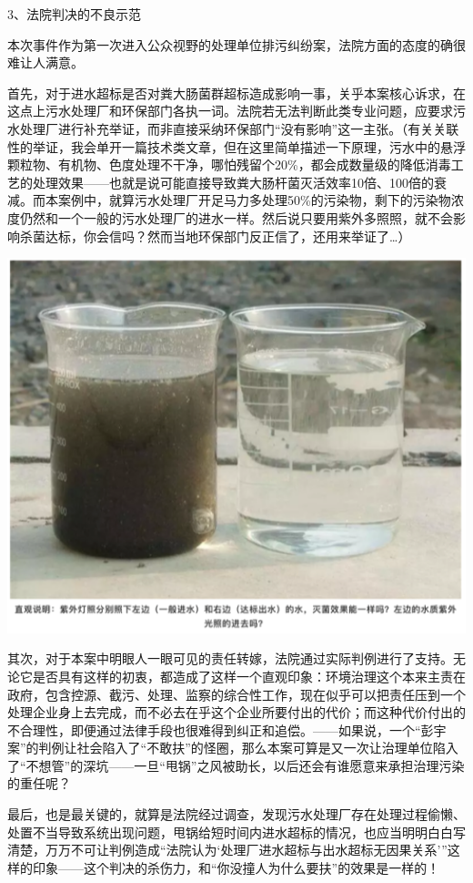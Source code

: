 \documentclass[]{book}
\begin{document}
3、法院判决的不良示范

本次事件作为第一次进入公众视野的处理单位排污纠纷案，法院方面的态度的确很难让人满意。

首先，对于进水超标是否对粪大肠菌群超标造成影响一事，关乎本案核心诉求，在这点上污水处理厂和环保部门各执一词。法院若无法判断此类专业问题，应要求污水处理厂进行补充举证，而非直接采纳环保部门``没有影响''这一主张。（有关关联性的举证，我会单开一篇技术类文章，但在这里简单描述一下原理，污水中的悬浮颗粒物、有机物、色度处理不干净，哪怕残留个20\%，都会成数量级的降低消毒工艺的处理效果------也就是说可能直接导致粪大肠杆菌灭活效率10倍、100倍的衰减。而本案例中，就算污水处理厂开足马力多处理50\%的污染物，剩下的污染物浓度仍然和一个一般的污水处理厂的进水一样。然后说只要用紫外多照照，就不会影响杀菌达标，你会信吗？然而当地环保部门反正信了，还用来举证了\ldots{}）

\includegraphics[width=6.67in]{images/py4}

其次，对于本案中明眼人一眼可见的责任转嫁，法院通过实际判例进行了支持。无论它是否具有这样的初衷，都造成了这样一个直观印象：环境治理这个本来主责在政府，包含控源、截污、处理、监察的综合性工作，现在似乎可以把责任压到一个处理企业身上去完成，而不必去在乎这个企业所要付出的代价；而这种代价付出的不合理性，即便通过法律手段也很难得到纠正和追偿。------如果说，一个``彭宇案''的判例让社会陷入了``不敢扶''的怪圈，那么本案可算是又一次让治理单位陷入了``不想管''的深坑------一旦``甩锅''之风被助长，以后还会有谁愿意来承担治理污染的重任呢？

最后，也是最关键的，就算是法院经过调查，发现污水处理厂存在处理过程偷懒、处置不当导致系统出现问题，甩锅给短时间内进水超标的情况，也应当明明白白写清楚，万万不可让判例造成``法院认为`处理厂进水超标与出水超标无因果关系'''这样的印象------这个判决的杀伤力，和``你没撞人为什么要扶''的效果是一样的！
\end{document}
